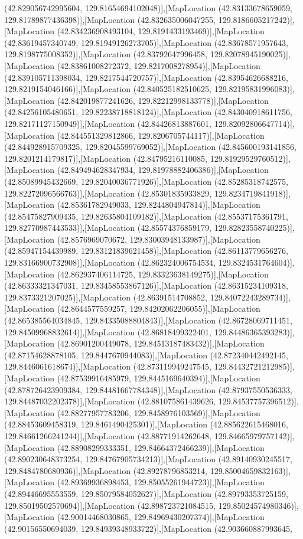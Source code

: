 (42.829056742995604, 129.81654694102048)],[MapLocation (42.83133678659059, 129.81789877436398)],[MapLocation (42.832635006047255, 129.8186605217242)],[MapLocation (42.834236908493104, 129.8191433193469)],[MapLocation (42.83619457340749, 129.81949126273705)],[MapLocation (42.83678571957643, 129.8198775008352)],[MapLocation (42.83792647996458, 129.82078945190025)],[MapLocation (42.83861008272372, 129.8217008278954)],[MapLocation (42.839105711398034, 129.8217544720757)],[MapLocation (42.83954626688216, 129.8219154046166)],[MapLocation (42.840525182510625, 129.82195831996083)],[MapLocation (42.842019877241626, 129.82212998133778)],[MapLocation (42.84256105480651, 129.82238718818124)],[MapLocation (42.843040918611756, 129.82171127150949)],[MapLocation (42.84426813887601, 129.82092806647714)],[MapLocation (42.844551329812866, 129.8206705744117)],[MapLocation (42.844928915709325, 129.82045599769052)],[MapLocation (42.845600193141856, 129.8201214179817)],[MapLocation (42.84795216110085, 129.81929529760512)],[MapLocation (42.849494628347934, 129.81978882406386)],[MapLocation (42.85089945432669, 129.82040036771926)],[MapLocation (42.85285318742575, 129.82272096566763)],[MapLocation (42.85301835933829, 129.8234719841918)],[MapLocation (42.85361782949033, 129.8244804947814)],[MapLocation (42.85475827909435, 129.82635804109182)],[MapLocation (42.85537175361791, 129.82770987443533)],[MapLocation (42.85574376859179, 129.82823558740225)],[MapLocation (42.8576969070672, 129.83003948133987)],[MapLocation (42.85947154439989, 129.83121839621458)],[MapLocation (42.86113779656276, 129.83166900732908)],[MapLocation (42.862324006754534, 129.8324531764604)],[MapLocation (42.862937406114725, 129.83323638149275)],[MapLocation (42.86333321347031, 129.83458553867126)],[MapLocation (42.86315234109318, 129.8373321207025)],[MapLocation (42.86391514708852, 129.84072243289734)],[MapLocation (42.8644577559257, 129.84202062206055)],[MapLocation (42.865385564034845, 129.84335088804843)],[MapLocation (42.86728069711451, 129.84509968832614)],[MapLocation (42.86818499322401, 129.84486365393283)],[MapLocation (42.86901200449078, 129.84513187483432)],[MapLocation (42.87154628878105, 129.8447670944083)],[MapLocation (42.872340442492145, 129.8446061618674)],[MapLocation (42.873119949247545, 129.84432721212985)],[MapLocation (42.87539916485979, 129.8445169640394)],[MapLocation (42.878726423909384, 129.84481667784348)],[MapLocation (42.87937550536333, 129.84487032202378)],[MapLocation (42.881075861439626, 129.84537757396512)],[MapLocation (42.88277957783206, 129.8458976103569)],[MapLocation (42.88453609458319, 129.8461490425301)],[MapLocation (42.885622615468016, 129.84661266241244)],[MapLocation (42.88771914262648, 129.84665979757142)],[MapLocation (42.88908299333351, 129.84664372466239)],[MapLocation (42.890230648373254, 129.84767905734213)],[MapLocation (42.89140930245517, 129.8484780680936)],[MapLocation (42.89278796853214, 129.85004659832163)],[MapLocation (42.89369936898453, 129.85055261944723)],[MapLocation (42.89446695553559, 129.85079584052627)],[MapLocation (42.89793353725159, 129.85019502570694)],[MapLocation (42.898723721084515, 129.85024574980346)],[MapLocation (42.90014468030865, 129.84969430207374)],[MapLocation (42.90156550694039, 129.84939348933722)],[MapLocation (42.903660887993645, 